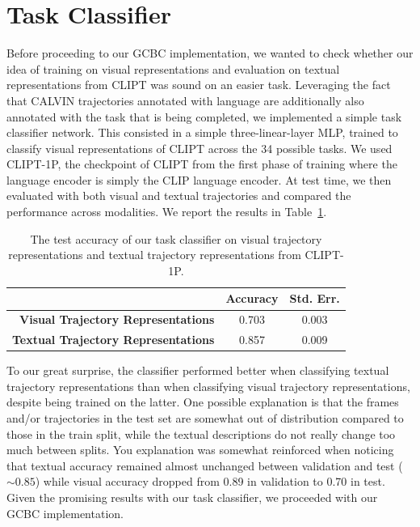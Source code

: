 \documentclass[../main.tex]{subfiles}
\begin{document}
\section{Task Classifier}

Before proceeding to our GCBC implementation, we wanted to check whether our idea of training on
visual representations and evaluation on textual representations from CLIPT was sound on an easier
task. Leveraging the fact that CALVIN trajectories annotated with language are additionally also
annotated with the task that is being completed, we implemented a simple task classifier network.
This consisted in a simple three-linear-layer MLP, trained to classify visual representations of
CLIPT across the 34 possible tasks. We used CLIPT-1P, the checkpoint of CLIPT from the first phase
of training where the language encoder is simply the CLIP language encoder. At test time, we then
evaluated with both visual and textual trajectories and compared the performance across modalities.
We report the results in Table~\ref{tab:task-classifier}.

\begin{table}[tb]
	\centering
	\caption[The test accuracy of our task classifier.]{The test accuracy of our task classifier on
		visual trajectory representations and textual trajectory representations from CLIPT-1P.}
	\label{tab:task-classifier}
	\begin{tabular}{@{}rcc@{}}
		\toprule
		                                            & \textbf{Accuracy} & \textbf{Std. Err.} \\ \midrule
		\textbf{Visual Trajectory Representations}  & 0.703             & 0.003              \\
		\textbf{Textual Trajectory Representations} & 0.857             & 0.009              \\ \bottomrule
	\end{tabular}
\end{table}

To our great surprise, the classifier performed better when classifying textual trajectory
representations than when classifying visual trajectory representations, despite being trained on
the latter. One possible explanation is that the frames and/or trajectories in the test set are
somewhat out of distribution compared to those in the train split, while the textual descriptions do
not really change too much between splits. You explanation was somewhat reinforced when noticing
that textual accuracy remained almost unchanged between validation and test ($\sim 0.85$) while
visual accuracy dropped from 0.89 in validation to 0.70 in test. Given the promising results with
our task classifier, we proceeded with our GCBC implementation.
\end{document}
